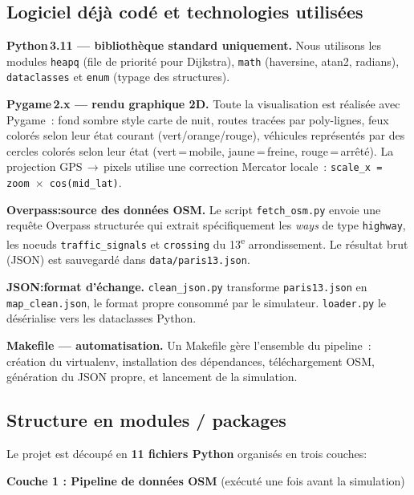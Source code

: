 \documentclass[a4paper,10pt]{article}
\begin{document}
\subsection{Logiciel d\'{e}j\`{a} cod\'{e} et technologies utilis\'{e}es}

\textbf{Python\,3.11 --- biblioth\`{e}que standard uniquement.}
Nous utilisons les modules \texttt{heapq} (file de priorit\'{e} pour Dijkstra),
\texttt{math} (haversine, atan2, radians), \texttt{dataclasses} et \texttt{enum}
(typage des structures).

\textbf{Pygame\,2.x --- rendu graphique 2D.}
Toute la visualisation est r\'{e}alis\'{e}e avec Pygame~: fond sombre style carte
de nuit, routes trac\'{e}es par poly-lignes, feux color\'{e}s selon leur \'{e}tat
courant (vert/orange/rouge), v\'{e}hicules repr\'{e}sent\'{e}s par des cercles
color\'{e}s selon leur \'{e}tat (vert\,=\,mobile, jaune\,=\,freine, rouge\,=\,arr\^{e}t\'{e}).
La projection GPS\,$\to$\,pixels utilise une correction Mercator locale~:
\texttt{scale\_x\,=\,zoom\,$\times$\,cos(mid\_lat)}.

\textbf{Overpass:source des donn\'{e}es OSM.}
Le script \texttt{fetch\_osm.py} envoie une requ\^{e}te Overpass structur\'{e}e
qui extrait sp\'{e}cifiquement les \textit{ways} de type \texttt{highway},
les noeuds \texttt{traffic\_signals} et \texttt{crossing} du
13\textsuperscript{e} arrondissement. Le r\'{e}sultat brut (JSON) est sauvegard\'{e}
dans \texttt{data/paris13.json}.

\textbf{JSON:format d'\'{e}change.}
\texttt{clean\_json.py} transforme \texttt{paris13.json} en \texttt{map\_clean.json},
le format propre consomm\'{e} par le simulateur. \texttt{loader.py} le
d\'{e}s\'{e}rialise vers les dataclasses Python.

\textbf{Makefile --- automatisation.}
Un Makefile g\`{e}re l'ensemble du pipeline~: cr\'{e}ation du virtualenv,
installation des d\'{e}pendances, t\'{e}l\'{e}chargement OSM, g\'{e}n\'{e}ration du JSON
propre, et lancement de la simulation.

\subsection{Structure en modules / packages}

Le projet est d\'{e}coup\'{e} en \textbf{11 fichiers Python} organis\'{e}s
en trois couches:

\medskip
\noindent\textbf{Couche 1 : Pipeline de donn\'{e}es OSM}
(ex\'{e}cut\'{e} une fois avant la simulation)
\end{document}
